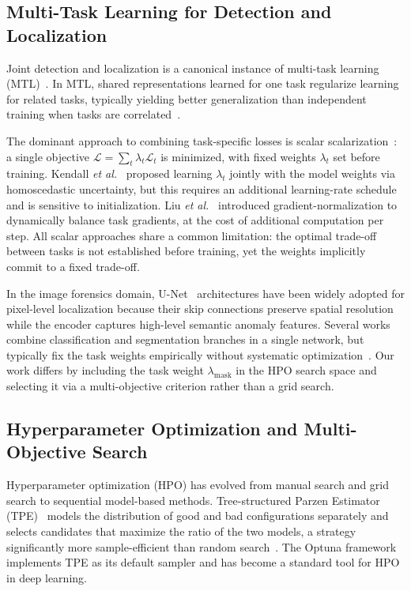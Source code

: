 \subsection{Multi-Task Learning for Detection and Localization}

Joint detection and localization is a canonical instance of multi-task learning
(MTL)~\cite{caruana1997multitask, ruder2017overview}. In MTL, shared representations
learned for one task regularize learning for related tasks, typically yielding better
generalization than independent training when tasks are correlated~\cite{crawshaw2020multi}.

The dominant approach to combining task-specific losses is scalar
scalarization~\cite{marler2004survey}: a single objective $\mathcal{L} = \sum_t
\lambda_t \mathcal{L}_t$ is minimized, with fixed weights $\lambda_t$ set before
training. Kendall \textit{et al.}~\cite{kendall2018multi} proposed learning $\lambda_t$
jointly with the model weights via homoscedastic uncertainty, but this requires an
additional learning-rate schedule and is sensitive to initialization. Liu \textit{et al.}~\cite{liu2019end}
introduced gradient-normalization to dynamically balance task gradients, at the cost
of additional computation per step. All scalar approaches share a common limitation:
the optimal trade-off between tasks is not established before training, yet the
weights implicitly commit to a fixed trade-off.

In the image forensics domain, U-Net~\cite{unet2015} architectures have been widely
adopted for pixel-level localization because their skip connections preserve spatial
resolution while the encoder captures high-level semantic anomaly features. Several
works combine classification and segmentation branches in a single network, but
typically fix the task weights empirically without systematic
optimization~\cite{wu2022robust}. Our work differs by including the task weight
$\lambda_{\text{mask}}$ in the HPO search space and selecting it via a
multi-objective criterion rather than a grid search.

\subsection{Hyperparameter Optimization and Multi-Objective Search}

Hyperparameter optimization (HPO) has evolved from manual search and grid search to
sequential model-based methods. Tree-structured Parzen Estimator
(TPE)~\cite{tpe2011} models the distribution of good and bad configurations
separately and selects candidates that maximize the ratio of the two models, a
strategy significantly more sample-efficient than random search~\cite{randomsearch2012}.
The Optuna framework~\cite{optuna2019} implements TPE as its default sampler and
has become a standard tool for HPO in deep learning.

